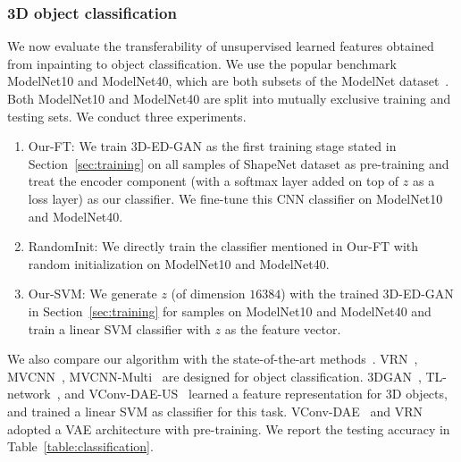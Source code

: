 \documentclass[10pt,twocolumn,letterpaper]{article}
\begin{document}
\subsubsection{3D object classification}
We now evaluate the transferability of unsupervised learned features obtained from inpainting to object classification. We use the popular benchmark ModelNet10 and ModelNet40, which are both subsets of the ModelNet dataset~\cite{modelnet}. Both ModelNet10 and ModelNet40 are split into mutually exclusive training and testing sets. We conduct three experiments.
\begin{enumerate}
\item Our-FT: We train 3D-ED-GAN as the first training stage stated in Section~\ref{sec:training} on all samples of ShapeNet dataset as pre-training and treat the encoder component (with a softmax layer added on top of $z$ as a loss layer) as our classifier. We fine-tune this CNN classifier on ModelNet10 and ModelNet40. 
\item RandomInit: We directly train the classifier mentioned in Our-FT with random initialization on ModelNet10 and ModelNet40.
\item Our-SVM: We generate $z$ (of dimension $16384$) with the trained 3D-ED-GAN in Section~\ref{sec:training} for samples on ModelNet10 and ModelNet40 and train a linear SVM classifier with $z$ as the feature vector.
\end{enumerate}
We also compare our algorithm with the state-of-the-art methods~\cite{3dgan,vconvdae,tl,generativediscriminative,sumultiview,qimultiview,shapenet}. VRN~\cite{generativediscriminative}, MVCNN~\cite{sumultiview}, MVCNN-Multi~\cite{qimultiview} are designed for object classification. 3DGAN~\cite{3dgan}, TL-network~\cite{tl}, and VConv-DAE-US~\cite{vconvdae} learned a feature representation for 3D objects, and trained a linear SVM as classifier for this task. VConv-DAE~\cite{vconvdae} and VRN~\cite{generativediscriminative} adopted a VAE architecture with pre-training. We report the testing accuracy in Table~\ref{table:classification}.
\end{document}
